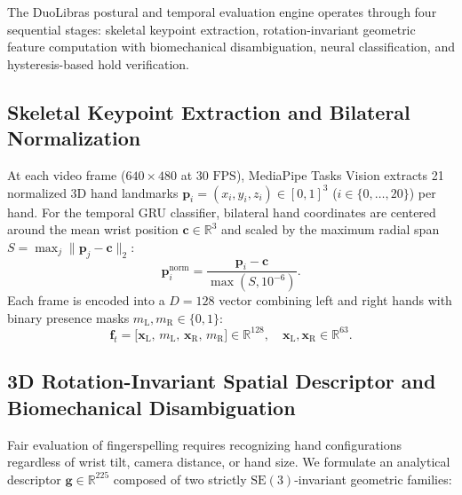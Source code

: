 \documentclass[12pt,a4paper]{article}
\begin{document}
The DuoLibras postural and temporal evaluation engine operates through four sequential stages: skeletal keypoint extraction, rotation-invariant geometric feature computation with biomechanical disambiguation, neural classification, and hysteresis-based hold verification.

\subsection{Skeletal Keypoint Extraction and Bilateral Normalization}

At each video frame ($640 \times 480$ at $30\text{ FPS}$), MediaPipe Tasks Vision extracts 21 normalized 3D hand landmarks $\mathbf{p}_i = (x_i, y_i, z_i) \in [0, 1]^3$ ($i \in \{0, \dots, 20\}$) per hand. For the temporal GRU classifier, bilateral hand coordinates are centered around the mean wrist position $\mathbf{c} \in \mathbb{R}^3$ and scaled by the maximum radial span $S = \max_j \|\mathbf{p}_j - \mathbf{c}\|_2$:
\begin{equation}
    \mathbf{p}_i^{\text{norm}} = \frac{\mathbf{p}_i - \mathbf{c}}{\max(S, 10^{-6})}.
    \label{eq:norm}
\end{equation}
Each frame is encoded into a $D = 128$ vector combining left and right hands with binary presence masks $m_{\text{L}}, m_{\text{R}} \in \{0, 1\}$:
\begin{equation}
    \mathbf{f}_t = \big[ \mathbf{x}_{\text{L}},\, m_{\text{L}},\, \mathbf{x}_{\text{R}},\, m_{\text{R}} \big] \in \mathbb{R}^{128}, \quad \mathbf{x}_{\text{L}}, \mathbf{x}_{\text{R}} \in \mathbb{R}^{63}.
    \label{eq:feat128}
\end{equation}

\subsection{3D Rotation-Invariant Spatial Descriptor and Biomechanical Disambiguation}

Fair evaluation of fingerspelling requires recognizing hand configurations regardless of wrist tilt, camera distance, or hand size. We formulate an analytical descriptor $\mathbf{g} \in \mathbb{R}^{225}$ composed of two strictly $\text{SE}(3)$-invariant geometric families:
\end{document}
